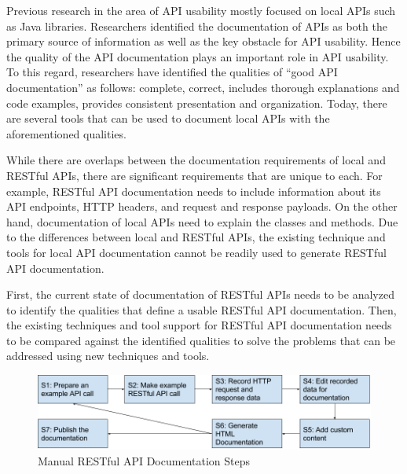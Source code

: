 \documentclass[11pt,oneside]{book}
\begin{document}
Previous research in the area of API usability mostly focused on local APIs such as Java libraries. Researchers identified the documentation of APIs as both the primary source of information as well as the key obstacle for API usability. Hence the quality of the API documentation plays an important role in API usability. To this regard, researchers have identified the qualities of ``good API documentation'' as follows: complete, correct, includes thorough explanations and code examples, provides consistent presentation and organization. Today, there are several tools that can be used to document local APIs with the aforementioned qualities.

While there are overlaps between the documentation requirements of local and RESTful APIs, there are significant requirements that are unique to each. For example, RESTful API documentation needs to include information about its API endpoints, HTTP headers, and request and response payloads. On the other hand, documentation of local APIs need to explain the classes and methods. Due to the differences between local and RESTful APIs, the existing technique and tools for local API documentation cannot be readily used to generate RESTful API documentation.

First, the current state of documentation of RESTful APIs needs to be analyzed to identify the qualities that define a usable RESTful API documentation. Then, the existing techniques and tool support for RESTful API documentation needs to be compared against the identified qualities to solve the problems that can be addressed using new techniques and tools.

\begin{figure}[htb]
  \includegraphics[width=\linewidth]{manual_workflow.png}
  \caption{Manual RESTful API Documentation Steps}
  \label{fig:manual}
\end{figure}
\end{document}
